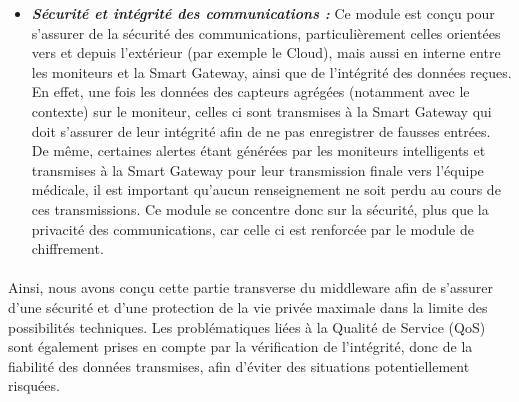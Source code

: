 \begin{itemize}
\item \textbf{\textit{Sécurité et intégrité des communications :}} Ce module est conçu pour s'assurer de la sécurité des communications, particulièrement celles orientées vers et depuis l'extérieur (par exemple le Cloud), mais aussi en interne entre les moniteurs et la Smart Gateway, ainsi que de l'intégrité des données reçues. En effet, une fois les données des capteurs agrégées (notamment avec le contexte) sur le moniteur, celles ci sont transmises à la Smart Gateway qui doit s'assurer de leur intégrité afin de ne pas enregistrer de fausses entrées. De même, certaines alertes étant générées par les moniteurs intelligents et transmises à la Smart Gateway pour leur transmission finale vers l'équipe médicale, il est important qu'aucun renseignement ne soit perdu au cours de ces transmissions. Ce module se concentre donc sur la sécurité, plus que la privacité des communications, car celle ci est renforcée par le module de chiffrement.\\
\end{itemize}
\paragraph{}
Ainsi, nous avons conçu cette partie transverse du middleware afin de s'assurer d'une sécurité et d'une protection de la vie
privée maximale dans la limite des possibilités techniques. Les problématiques liées à la Qualité de Service (QoS) sont également
prises en compte par la vérification de l'intégrité, donc de la fiabilité des données transmises, afin d'éviter des situations potentiellement risquées.
